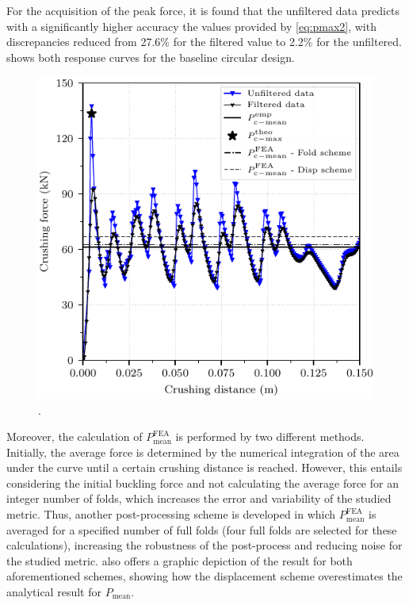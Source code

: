 \documentclass[12pt,number,preprint,review,times]{elsarticle}
\begin{document}
For the acquisition of the peak force, it is found that the unfiltered data predicts with a significantly higher accuracy the values provided by \cref{eq:pmax2}, with discrepancies reduced from 27.6\% for the filtered value to 2.2\% for the unfiltered.  shows both response curves for the baseline circular design.

\begin{figure}[htpb]
  \centering
   \includegraphics[width=1\columnwidth]{./fd-processing.pdf}
  \caption{.}
  \label{img:fd_unf-filt}
\end{figure}

Moreover, the calculation of $P^{\mathrm{FEA}}_{\mathrm{mean}}$ is performed by two different methods. Initially, the average force is determined by the numerical integration of the area under the curve until a certain crushing distance is reached. However, this entails considering the initial buckling force and not calculating the average force for an integer number of folds, which increases the error and variability of the studied metric. Thus, another post-processing scheme is developed in which $P^{\mathrm{FEA}}_{\mathrm{mean}}$ is averaged for a specified number of full folds  (four full folds are selected for these calculations), increasing the robustness of the post-process and reducing noise for the studied metric.  also offers a graphic depiction of the result for both aforementioned schemes, showing how the displacement scheme overestimates the analytical result for $P^{\mathrm{}}_{\mathrm{mean}}$. 
\end{document}
